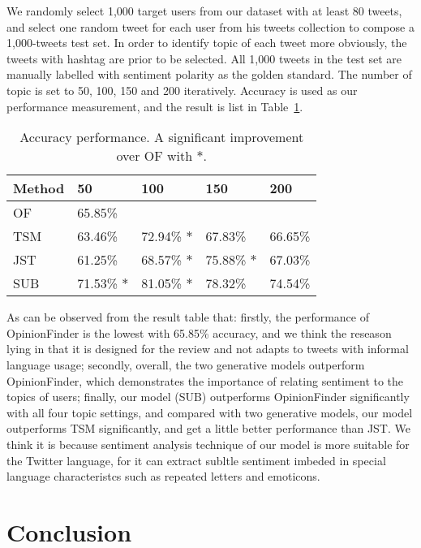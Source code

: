 \begin{landscape}
We randomly select 1,000 target users from our dataset with at least 80 tweets, and select one random tweet for each user from his tweets collection to compose a 1,000-tweets test set. In order to identify topic of each tweet more obviously, the tweets with hashtag are prior to be selected. All 1,000 tweets in the test set are manually labelled with sentiment polarity as the golden standard. The number of topic is set to 50, 100, 150 and 200 iteratively. Accuracy is used as our performance measurement, and the result is list in Table~\ref{tab2}.
\begin{table}[htb]
\centering
\caption{Accuracy performance. A significant improvement over OF with $ \ast $.}
\label{tab2}
\begin{tabular}{l|llll}
\hline
Method & 50 & 100 & 150 & 200\\
\hline
OF &  65.85\%& & & \\
TSM & 63.46\%& 72.94\% $ \ast $  &67.83\% & 66.65\% \\
JST & 61.25\% & 68.57\% $ \ast $ & 75.88\%  $ \ast $ & 67.03\%\\
SUB & 71.53\% $ \ast $ & 81.05\% $ \ast $ & 78.32\% & 74.54\%\\
\hline
\end{tabular}
\end{table}

As can be observed from the result table that: firstly, the performance of OpinionFinder is the lowest with 65.85\% accuracy, and we think the reseason lying in that it is designed for the review and not adapts to tweets with informal language usage; secondly, overall, the two generative models outperform OpinionFinder, which demonstrates the importance of relating sentiment to the topics of users; finally, our model (SUB) outperforms OpinionFinder significantly with all four topic settings, and compared with two generative models, our model outperforms TSM significantly, and get a little better performance than JST. We think it is because sentiment analysis technique of our model is more suitable for the Twitter language, for it can extract subltle sentiment imbeded in special language characteristcs such as repeated letters and emoticons.

\section*{Conclusion}
\label{sec6}


\end{landscape}
